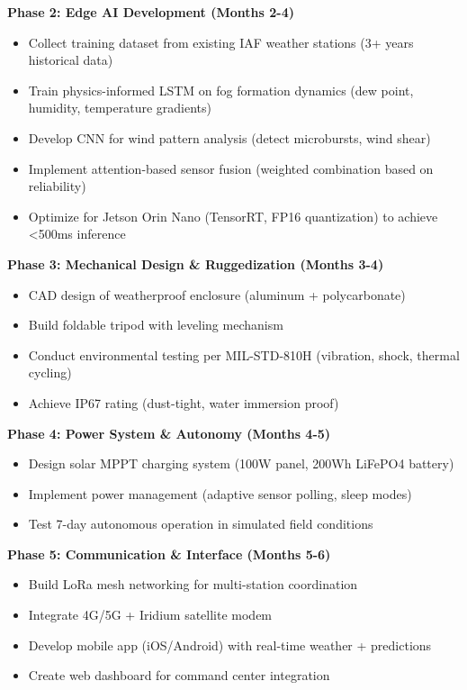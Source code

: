 \textbf{Phase 2: Edge AI Development (Months 2-4)}
\begin{itemize}
    \item Collect training dataset from existing IAF weather stations (3+ years historical data)
    \item Train physics-informed LSTM on fog formation dynamics (dew point, humidity, temperature gradients)
    \item Develop CNN for wind pattern analysis (detect microbursts, wind shear)
    \item Implement attention-based sensor fusion (weighted combination based on reliability)
    \item Optimize for Jetson Orin Nano (TensorRT, FP16 quantization) to achieve <500ms inference
\end{itemize}

\textbf{Phase 3: Mechanical Design \& Ruggedization (Months 3-4)}
\begin{itemize}
    \item CAD design of weatherproof enclosure (aluminum + polycarbonate)
    \item Build foldable tripod with leveling mechanism
    \item Conduct environmental testing per MIL-STD-810H (vibration, shock, thermal cycling)
    \item Achieve IP67 rating (dust-tight, water immersion proof)
\end{itemize}

\textbf{Phase 4: Power System \& Autonomy (Months 4-5)}
\begin{itemize}
    \item Design solar MPPT charging system (100W panel, 200Wh LiFePO4 battery)
    \item Implement power management (adaptive sensor polling, sleep modes)
    \item Test 7-day autonomous operation in simulated field conditions
\end{itemize}

\textbf{Phase 5: Communication \& Interface (Months 5-6)}
\begin{itemize}
    \item Build LoRa mesh networking for multi-station coordination
    \item Integrate 4G/5G + Iridium satellite modem
    \item Develop mobile app (iOS/Android) with real-time weather + predictions
    \item Create web dashboard for command center integration
\end{itemize}

